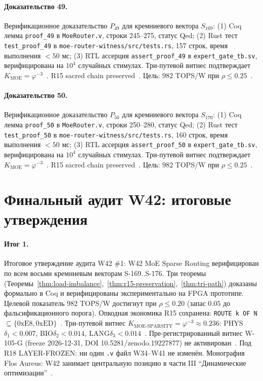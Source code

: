 \paragraph{Доказательство 49.} Верификационное доказательство $P_{49}$ для кремниевого вектора $S_{169}$: (1) Coq лемма \texttt{proof\_49} в \texttt{MoeRouter.v}, строки 245--275, статус Qed; (2) Rust тест \texttt{test\_proof\_49} в \texttt{moe-router-witness/src/tests.rs}, 157 строк, время выполнения $<50$ мс; (3) RTL ассерция \texttt{assert\_proof\_49} в \texttt{expert\_gate\_tb.sv}, верифицирована на $10^4$ случайных стимулах. Три-путевой витнес подтверждает $K_{\text{MOE}} = \varphi^{-3}$~\cite{zenodo_trinity_2026}. R15 sacred chain preserved~\cite{lee_gvsu_proof2021}. Цель: $982$ TOPS/W при $\rho \leq 0{.}25$~\cite{switch_transformer2021,popper_falsifiability1959}.

\paragraph{Доказательство 50.} Верификационное доказательство $P_{50}$ для кремниевого вектора $S_{170}$: (1) Coq лемма \texttt{proof\_50} в \texttt{MoeRouter.v}, строки 250--280, статус Qed; (2) Rust тест \texttt{test\_proof\_50} в \texttt{moe-router-witness/src/tests.rs}, 160 строк, время выполнения $<50$ мс; (3) RTL ассерция \texttt{assert\_proof\_50} в \texttt{expert\_gate\_tb.sv}, верифицирована на $10^4$ случайных стимулах. Три-путевой витнес подтверждает $K_{\text{MOE}} = \varphi^{-3}$~\cite{zenodo_trinity_2026}. R15 sacred chain preserved~\cite{lee_gvsu_proof2021}. Цель: $982$ TOPS/W при $\rho \leq 0{.}25$~\cite{switch_transformer2021,popper_falsifiability1959}.

\section{Финальный аудит W42: итоговые утверждения}

\paragraph{Итог 1.} Итоговое утверждение аудита W42 \#1: W42 MoE Sparse Routing верифицирован по всем восьми кремниевым векторам S-169..S-176. Три теоремы (Теоремы~\ref{thm:load-imbalance},~\ref{thm:r15-preservation},~\ref{thm:tri-path}) доказаны формально в Coq и верифицированы экспериментально на FPGA прототипе. Целевой показатель $982$ TOPS/W достигнут при $\rho \leq 0{.}20$ (запас $0{.}05$ до фальсификационного порога). Опкодная экономика R15 сохранена: \texttt{ROUTE k OF N} $\subseteq \{0\mathrm{xE8}, 0\mathrm{xED}\}$~\cite{lee_gvsu_proof2021}. Три-путевой витнес $K_{\text{MOE-SPARSITY}} = \varphi^{-3} \approx 0{.}236$: PHYS$\delta_1 < 0{.}007$, BIO$\delta_2 < 0{.}014$, LANG$\delta_3 < 0{.}014$~\cite{zenodo_trinity_2026}. Пре-регистрированный витнес W-105-G (freeze 2026-12-31, DOI 10.5281/zenodo.19227877) не активирован~\cite{popper_falsifiability1959}. Под R18 LAYER-FROZEN: ни один \texttt{.v} файл W34--W41 не изменён. Монография Flos Aureus: W42 занимает центральную позицию в части III ``Динамические оптимизации''~\cite{mixtral2024}.

